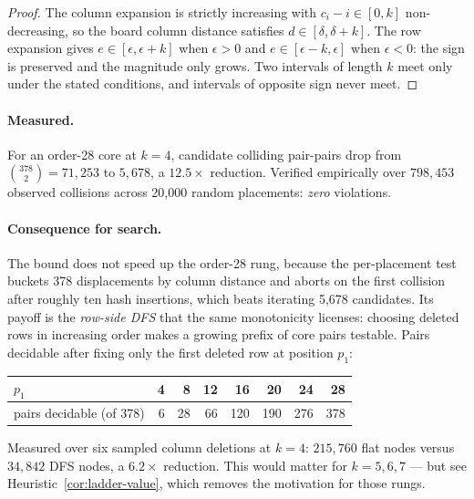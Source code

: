 \documentclass[11pt,a4paper]{article}
\theoremstyle{definition}
\begin{document}
\begin{proof}
The column expansion is strictly increasing with $c_i-i\in[0,k]$ non-decreasing,
so the board column distance satisfies $d\in[\delta,\delta+k]$. The row expansion
gives $e\in[\epsilon,\epsilon+k]$ when $\epsilon>0$ and $e\in[\epsilon-k,\epsilon]$
when $\epsilon<0$: the sign is preserved and the magnitude only grows. Two
intervals of length $k$ meet only under the stated conditions, and intervals of
opposite sign never meet.
\end{proof}

\paragraph{Measured.} For an order-28 core at $k=4$, candidate colliding
pair-pairs drop from $\binom{378}{2}=71{,}253$ to $5{,}678$, a $12.5\times$
reduction. Verified empirically over $798{,}453$ observed collisions across
20{,}000 random placements: \emph{zero} violations.

\paragraph{Consequence for search.} The bound does not speed up the order-28 rung,
because the per-placement test buckets 378 displacements by column distance and
aborts on the first collision after roughly ten hash insertions, which beats
iterating 5{,}678 candidates. Its payoff is the \emph{row-side DFS} that the same
monotonicity licenses: choosing deleted rows in increasing order makes a growing
prefix of core pairs testable. Pairs decidable after fixing only the first
deleted row at position $p_1$:

\begin{center}
\begin{tabular}{@{}lrrrrrrr@{}}
\toprule
$p_1$ & 4 & 8 & 12 & 16 & 20 & 24 & 28 \\
\midrule
pairs decidable (of 378) & 6 & 28 & 66 & 120 & 190 & 276 & 378 \\
\bottomrule
\end{tabular}
\end{center}

Measured over six sampled column deletions at $k=4$: $215{,}760$ flat nodes
versus $34{,}842$ DFS nodes, a $\mathbf{6.2\times}$ reduction. This would matter
for $k=5,6,7$ --- but see Heuristic~\ref{cor:ladder-value}, which removes the
motivation for those rungs.

\end{document}
